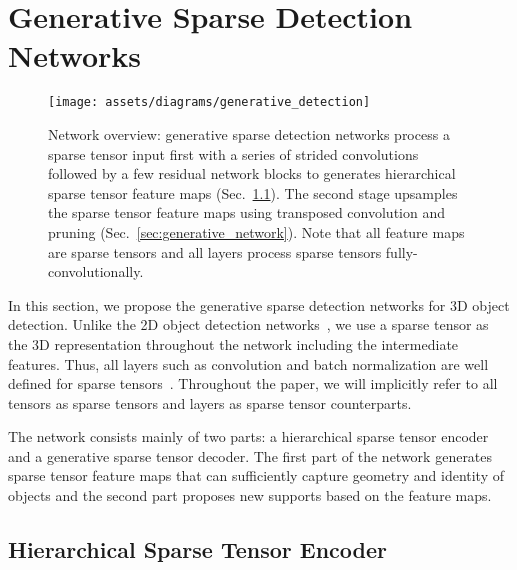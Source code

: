 \documentclass[runningheads]{llncs}
\begin{document}
%
 \section{Generative Sparse Detection Networks}

\begin{figure}[t]
\centering
\small
\texttt{[image: assets/diagrams/generative\_detection]}
\caption{Network overview: generative sparse detection networks process a sparse tensor input first with a series of strided convolutions followed by a few residual network blocks to generates hierarchical sparse tensor feature maps (Sec.~\ref{sec:sparse_pyramid}). The second stage upsamples the sparse tensor feature maps using transposed convolution and pruning (Sec.~\ref{sec:generative_network}). Note that all feature maps are sparse tensors and all layers process sparse tensors fully-convolutionally.}
\label{fig:network}
\vspace{-1em}
\end{figure}

In this section, we propose the generative sparse detection networks for 3D object detection. Unlike the 2D object detection networks~\cite{lin2017feature,ren2015faster}, we use a sparse tensor as the 3D representation throughout the network including the intermediate features. Thus, all layers such as convolution and batch normalization are well defined for sparse tensors~\cite{sparseconvnet,minkowskinet}. Throughout the paper, we will implicitly refer to all tensors as sparse tensors and layers as sparse tensor counterparts.

The network consists mainly of two parts: a hierarchical sparse tensor encoder and a generative sparse tensor decoder. The first part of the network generates sparse tensor feature maps that can sufficiently capture geometry and identity of objects and the second part proposes new supports based on the feature maps.

















\subsection{Hierarchical Sparse Tensor Encoder}
\label{sec:sparse_pyramid}
\end{document}
